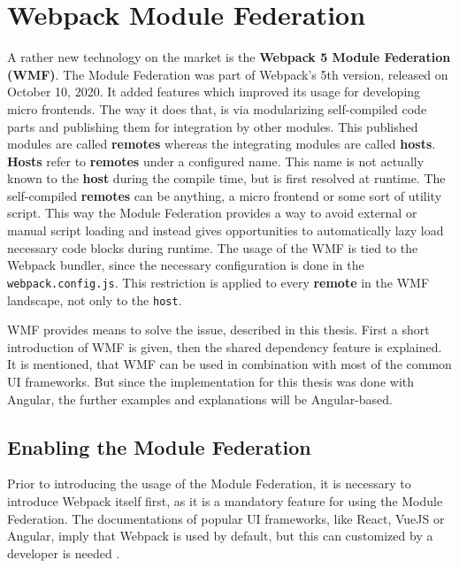 \chapter{Webpack Module Federation} %
\label{Chapter5}


A rather new technology on the market is the \textbf{Webpack 5 Module Federation (WMF)}. The Module Federation was part of Webpack's 5th version, released on October 10, 2020. It added features which improved its usage for developing micro frontends.\cite{wmf_concepts}
The way it does that, is via modularizing self-compiled code parts and publishing them for integration by other modules. This published modules are called \textbf{remotes} whereas the integrating modules are called \textbf{hosts}. 
\textbf{Hosts} refer to \textbf{remotes} under a configured name. This name is not actually known to the \textbf{host} during the compile time, but is first resolved at runtime.
The self-compiled \textbf{remotes} can be anything, a micro frontend or some sort of utility script. This way the Module Federation provides a way to avoid external or manual script loading and instead gives opportunities to automatically lazy load necessary code blocks during runtime.\cite{wmf_concepts}
The usage of the WMF is tied to the Webpack bundler, since the necessary configuration is done in the \texttt{webpack.config.js}. This restriction is applied to every \textbf{remote} in the WMF landscape, not only to the \texttt{host}.

WMF provides means to solve the issue, described in this thesis. First a short introduction of WMF is given, then the shared dependency feature is explained.
It is mentioned, that WMF can be used in combination with most of the common UI frameworks. But since the implementation for this thesis was done with Angular, the further examples and explanations will be Angular-based.

\section{Enabling the Module Federation}

Prior to introducing the usage of the Module Federation, it is necessary to introduce Webpack itself first, as it is a mandatory feature for using the Module Federation. The documentations of popular UI frameworks, like React, VueJS or Angular, imply that Webpack is used by default, but this can customized by a developer is needed \cite{webpack_angular}\cite{webpack_react}\cite{webpack_vue}.

